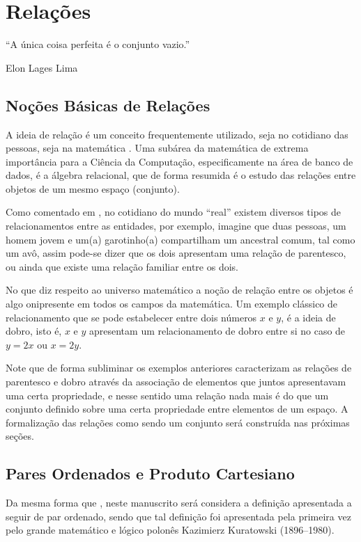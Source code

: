 \chapter{Relações}\label{cap:Relacoes}

\epigraph{``A única coisa perfeita é o conjunto vazio.''}{Elon Lages Lima}

\section{Noções Básicas de Relações}\label{sec:RelacaoParOdenado}

A ideia de relação é um conceito frequentemente utilizado, seja no cotidiano das pessoas, seja na matemática \cite{barreto1998}. Uma subárea da matemática de extrema importância para a Ciência da Computação, especificamente na área de banco de dados, é a álgebra relacional, que de forma resumida é o estudo das relações entre objetos de um mesmo espaço (conjunto). 

Como comentado em \cite{sussana2010-MD}, no cotidiano do mundo ``real'' existem diversos tipos de relacionamentos entre as entidades, por exemplo, imagine que duas pessoas, um homem jovem e um(a) garotinho(a) compartilham um ancestral comum, tal como um avô, assim pode-se dizer que os dois apresentam uma relação de parentesco, ou ainda que existe uma relação familiar entre os dois.  

No que diz respeito ao universo matemático a noção de relação entre os objetos é algo onipresente em todos os campos da matemática. Um exemplo clássico de relacionamento que se pode estabelecer entre dois números $x$ e $y$, é a ideia de dobro, isto é, $x$ e $y$ apresentam um relacionamento de dobro entre si no caso de $y = 2x$ ou $x = 2y$.

Note que de forma subliminar os exemplos anteriores caracterizam as relações de parentesco e dobro através da associação de elementos que juntos apresentavam uma certa propriedade, e nesse sentido uma relação nada mais é do que um conjunto definido sobre uma certa propriedade entre elementos de um espaço. A formalização das relações como sendo um conjunto será construída nas próximas seções.

\section{Pares Ordenados e Produto Cartesiano}\label{sec:ParesOrdenadoEProduto}

Da mesma forma que \cite{abe1991-TC}, neste manuscrito será considera a definição apresentada a seguir de par ordenado, sendo que tal definição foi apresentada pela primeira vez pelo grande matemático e lógico polonês Kazimierz Kuratowski (1896--1980).

